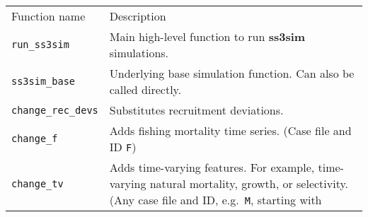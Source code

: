 \documentclass[11pt]{article}
\begin{document}
\begin{spacing}{1.2}
\begin{longtable}[c]{@{}ll@{}}
\hline\noalign{\medskip}
\begin{minipage}[b]{0.32\columnwidth}\raggedright
Function name
\end{minipage} & \begin{minipage}[b]{0.57\columnwidth}\raggedright
Description
\end{minipage}
\\\noalign{\medskip}
\hline\noalign{\medskip}
\begin{minipage}[t]{0.32\columnwidth}\raggedright
\texttt{run\_ss3sim}
\end{minipage} & \begin{minipage}[t]{0.57\columnwidth}\raggedright
Main high-level function to run \textbf{ss3sim} simulations.
\end{minipage}
\\\noalign{\medskip}
\begin{minipage}[t]{0.32\columnwidth}\raggedright
\texttt{ss3sim\_base}
\end{minipage} & \begin{minipage}[t]{0.57\columnwidth}\raggedright
Underlying base simulation function. Can also be called directly.
\end{minipage}
\\\noalign{\medskip}
\begin{minipage}[t]{0.32\columnwidth}\raggedright
\texttt{change\_rec\_devs}
\end{minipage} & \begin{minipage}[t]{0.57\columnwidth}\raggedright
Substitutes recruitment deviations.
\end{minipage}
\\\noalign{\medskip}
\begin{minipage}[t]{0.32\columnwidth}\raggedright
\texttt{change\_f}
\end{minipage} & \begin{minipage}[t]{0.57\columnwidth}\raggedright
Adds fishing mortality time series. (Case file and ID \texttt{F})
\end{minipage}
\\\noalign{\medskip}
\begin{minipage}[t]{0.32\columnwidth}\raggedright
\texttt{change\_tv}
\end{minipage} & \begin{minipage}[t]{0.57\columnwidth}\raggedright
Adds time-varying features. For example, time-varying natural mortality,
growth, or selectivity. (Any case file and ID, e.g.~\texttt{M}, starting with

\end{minipage}
\end{longtable}
\end{spacing}
\end{document}
